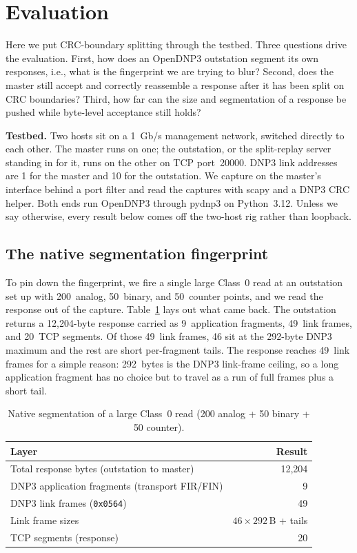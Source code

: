 \documentclass[conference]{IEEEtran}
\newcommand{\code}[1]{\texttt{#1}}
\begin{document}
\section{Evaluation}

Here we put CRC-boundary splitting through the testbed. Three questions drive the
evaluation. First, how does an OpenDNP3 outstation segment its own responses,
i.e., what is the fingerprint we are trying to blur? Second, does the master
still accept and correctly reassemble a response after it has been split on CRC
boundaries? Third, how far can the size and segmentation of a response be pushed
while byte-level acceptance still holds?

\noindent\textbf{Testbed.} Two hosts sit on a 1~Gb/s management network, switched
directly to each other. The master runs on one; the outstation, or the
split-replay server standing in for it, runs on the other on TCP port~20000. DNP3
link addresses are 1 for the master and 10 for the outstation. We capture on the
master's interface behind a port filter and read the captures with scapy and a
DNP3 CRC helper. Both ends run OpenDNP3 through pydnp3 on Python~3.12. Unless we
say otherwise, every result below comes off the two-host rig rather than loopback.

\subsection{The native segmentation fingerprint}

To pin down the fingerprint, we fire a single large Class~0 read at an outstation
set up with 200~analog, 50~binary, and 50~counter points, and we read the
response out of the capture. Table~\ref{tab:baseline} lays out what came back. The
outstation returns a 12{,}204-byte response carried as 9~application fragments,
49~link frames, and 20~TCP segments. Of those 49~link frames, 46 sit at the
292-byte DNP3 maximum and the rest are short per-fragment tails. The response
reaches 49~link frames for a simple reason: 292~bytes is the DNP3 link-frame
ceiling, so a long application fragment has no choice but to travel as a run of
full frames plus a short tail.

\begin{table}[t]
\centering
\caption{Native segmentation of a large Class~0 read (200 analog + 50 binary +
50 counter).}
\label{tab:baseline}
\begin{tabular}{@{}p{}r@{}}
\toprule
Layer & Result \\
\midrule
Total response bytes (outstation to master) & 12{,}204 \\
DNP3 application fragments (transport FIR/FIN) & 9 \\
DNP3 link frames (\code{0x0564}) & 49 \\
Link frame sizes & $46 \times 292$\,B + tails \\
TCP segments (response) & 20 \\
\bottomrule
\end{tabular}
\end{table}
\end{document}
